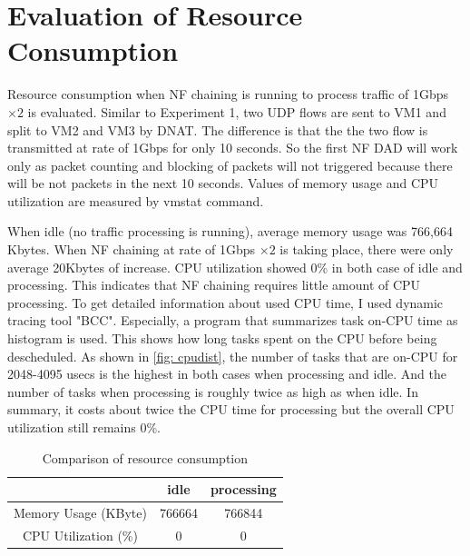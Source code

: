 \section{Evaluation of Resource Consumption}
Resource consumption when NF chaining is running to process traffic of 1Gbps $\times 2 $ is evaluated. Similar to Experiment 1, two UDP flows are sent to VM1 and split to VM2 and VM3 by DNAT. The difference is that the the two flow is transmitted at rate of 1Gbps for only 10 seconds. So the first NF DAD will work only as packet counting and blocking of packets will not triggered because there will be not packets in the next 10 seconds. Values of memory usage and CPU utilization are measured by vmstat command. 

When idle (no traffic processing is running), average memory usage was 766,664 Kbytes. When NF chaining at rate of 1Gbps $\times 2 $ is taking place, there were only average 20Kbytes of increase. CPU utilization showed 0\% in both case of idle and processing. This indicates that NF chaining requires little amount of CPU processing. To get detailed information about used CPU time, I used dynamic tracing tool "BCC". Especially, a program that summarizes task on-CPU time as histogram is used. This shows how long tasks spent on the CPU before being descheduled. As shown in \ref{fig: cpudist}, the number of tasks that are on-CPU for 2048-4095 usecs is the highest in both cases when processing and idle. And the number of tasks when processing is roughly twice as high as when idle. In summary, it costs about twice the CPU time for processing but the overall CPU utilization still remains 0\%. 

\begin{table}
	\centering
	\begin{tabular}{|c|c|c|}
	\hline
	 & idle & processing \\
	 \hline
	 Memory Usage (KByte) & 766664 & 766844 \\
	 \hline
	 CPU Utilization (\%) & 0 & 0 \\
	 \hline
	\end{tabular}
	\caption{Comparison of resource consumption}
	\label{tbl: resource}
\end{table}


